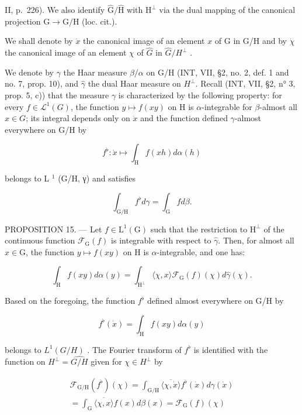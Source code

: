II, p.~226). We also identify \(\widehat{\mathrm{G}}/\widehat{\mathrm{H}}\) with \(\mathrm{H}^{\perp}\) via the dual mapping of the canonical projection \(\mathrm{G}\to\mathrm{G}/\mathrm{H}\) (loc. cit.).

We shall denote by \(\dot{x}\) the canonical image of an element \(x\) of G in G/H and by \(\dot{\chi}\) the canonical image of an element \(\chi\) of \(\widehat{G}\) in \(\widehat{G}/H^{\perp}\) .

We denote by \(\gamma\) the Haar measure \(\beta/\alpha\) on G/H (INT, VII, §2, no. 2, def. 1 and no. 7, prop. 10), and \(\widehat{\gamma}\) the dual Haar measure on \(H^{\perp}\). Recall (INT, VII, §2, n° 3, prop. 5, c)) that the measure \(\gamma\) is characterized by the following property: for every \(f \in \mathcal{L}^{1}(G)\), the function \(y \mapsto f(xy)\) on H is \(\alpha\)-integrable for \(\beta\)-almost all \(x \in G\); its integral depends only on \(\dot{x}\) and the function defined \(\gamma\)-almost everywhere on G/H by

\[
f ^ {\flat} \colon \dot {x} \mapsto \int_ {\mathrm{H}} f (x h) d \alpha (h)
\]

belongs to L \(^{1}\) (G/H, γ) and satisfies

\[
\int_ {\mathrm{G} / \mathrm{H}} f ^ {\flat} d \gamma = \int_ {\mathrm{G}} f d \beta .\tag{33}
\]

PROPOSITION 15. --- Let \(f \in \mathrm{L}^1(\mathrm{G})\) such that the restriction to \(\mathrm{H}^\perp\) of the continuous function \(\mathcal{F}_{\mathrm{G}}(f)\) is integrable with respect to \(\widehat{\gamma}\). Then, for almost all \(x \in \mathrm{G}\), the function \(y \mapsto f(xy)\) on \(\mathrm{H}\) is \(\alpha\)-integrable, and one has:

\[
\int_ {\mathrm{H}} f (x y) d \alpha (y) = \int_ {\mathrm{H} ^ {\perp}} \langle \chi , x \rangle \mathcal {F} _ {\mathrm{G}} (f) (\chi) d \widehat {\gamma} (\chi).
\]

Based on the foregoing, the function \(f^{\flat}\) defined almost everywhere on G/H by

\[
f ^ {\flat} (\dot {x}) = \int_ {\mathrm{H}} f (x y) d \alpha (y)
\]

belongs to \(L^{1}(G/H)\) . The Fourier transform of \(f^{\flat}\) is identified with the function on \(H^{\perp} = \widehat{G/H}\) given for \(\chi \in H^{\perp}\) by

\[
\begin{array}{r} \mathcal {F} _ {\mathrm{G/H}} (f ^ {\flat}) (\chi) = \int_ {\mathrm{G/H}} \overline {{\langle \chi , \dot {x} \rangle}} f ^ {\flat} (\dot {x}) d \gamma (\dot {x}) \\ = \int_ {\mathrm{G}} \overline {{\langle \chi , x \rangle}} f (x) d \beta (x) = \mathcal {F} _ {\mathrm{G}} (f) (\chi) \end{array}
\]

